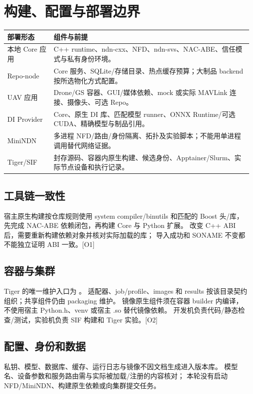 \newpage

\section{构建、配置与部署边界}
\begin{tabularx}{\linewidth}{@{}p{32mm}X@{}}
\toprule
部署形态 & 组件与前提 \\
\midrule
本地 Core 应用 & C++ runtime、ndn-cxx、NFD、ndn-svs、NAC-ABE、信任模式与私有身份环境。\\
Repo-node & Core 服务、SQLite/存储目录、热点缓存预算；大制品 backend 按所选物化方式配置。\\
UAV 应用 & Drone/GS 容器、GUI/媒体依赖、mock 或实际 MAVLink 连接、摄像头、可选 Repo。\\
DI Provider & Core、原生 DI 库、匹配模型 runner、ONNX Runtime/可选 CUDA、精确模型与制品引用。\\
MiniNDN & 多进程 NFD/路由/身份隔离、拓扑及实验脚本；不能用单进程调用替代网络证据。\\
Tiger/SIF & 封存源码、容器内原生构建、候选身份、Apptainer/Slurm、实际节点设备和执行记录。\\
\bottomrule
\end{tabularx}

\subsection{工具链一致性}
宿主原生构建按仓库规则使用 system compiler/binutils 和匹配的 Boost 头/库，
先完成 NAC-ABE 依赖闭包，再构建 Core 与 Python 扩展。
改变 C++ ABI 后，需要重新构建依赖对象并核对实际加载的库；
导入成功和 SONAME 不变都不能独立证明 ABI 一致。[O1]

\subsection{容器与集群}
Tiger 的唯一维护入口为 。
适配器、job/profile、images 和 results 按该目录契约组织；共享组件仍由 packaging 维护。
镜像原生组件须在容器 builder 内编译，不使用宿主 Python.h、venv 或宿主 .so 替代镜像依赖。
开发机负责代码/静态检查/测试，实验机负责 SIF 构建和 Tiger 实验。[O2]

\subsection{配置、身份和数据}
私钥、模型、数据库、缓存、运行日志与镜像不因文档生成进入版本库。
模型名、设备参数和服务路由需与实际被加载/注册的内容核对；
本轮没有启动 NFD/MiniNDN、构建原生依赖或向集群提交任务。


